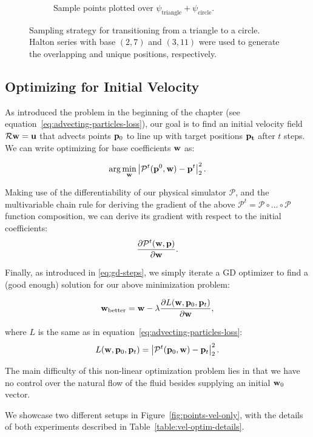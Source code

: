 \begin{figure}
\begin{subfigure}[t]{0.48\textwidth}
    \caption{Sample points plotted over $\psi_\text{triangle}
    + \psi_\text{circle}$.}
  \end{subfigure}\par\medskip
  \caption{Sampling strategy for transitioning from a triangle to a circle.
  Halton series with base $(2,7)$ and $(3,11)$ were used to generate the
  overlapping and unique positions, respectively.}
  \label{fig:sampling}
\end{figure}

\subsection{Optimizing for Initial Velocity}\label{section:initial-velocity} 
As introduced the problem in the beginning of the chapter (see
equation~\ref{eq:advecting-particles-loss}), our goal is to find an initial
velocity field $\mathcal{R}\vb{w} = \vb{u}$ that advects points $\vb{p}_0$ to
line up with target positions $\vb{p_t}$ after $t$ steps. 
We can write optimizing for base coefficients $\vb{w}$ as:

$$\arg\min_{\vb{w}} \left| \mathcal{P}^{t}(\vb{p}^0, \vb{w})
- \vb{p}^t\right|_2^2.$$

Making use of the differentiability of our physical simulator $\mathcal{P}$, and
the multivariable chain rule for deriving the gradient of the above
$\mathcal{P}^t = \mathcal{P}\circ\dots\circ\mathcal{P}$ function composition, we
can derive its gradient with respect to the initial coefficients:
$$\frac{\partial \mathcal{P}^t(\vb{w},\vb{p})}{\partial \vb{w}}.$$

Finally, as introduced in \eqref{eq:gd-steps}, we simply iterate a \ac{GD}
optimizer to find a (good enough) solution for our above minimization problem:

$$\vb{w}_{\text{better}} = \vb{w} - \lambda
\frac{
    \partial L(\vb{w}, \vb{p}_0, \vb{p}_t)
}{
    \partial \vb{w}
},$$

where $L$ is the same as in equation~\eqref{eq:advecting-particles-loss}:
\begin{equation*}
  L(\vb{w}, \vb{p}_0, \vb{p}_t)
  = \left| \mathcal{P}^{t}(\vb{p}_0, \vb{w}) - \vb{p}_t\right|_2^2.
\end{equation*}

The main difficulty of this non-linear optimization problem lies in that we have
no control over the natural flow of the fluid besides supplying an initial
$\vb{w}_0$ vector.

We showcase two different setups in Figure~\ref{fig:points-vel-only}, with the
details of both experiments described in Table~\ref{table:vel-optim-details}.


